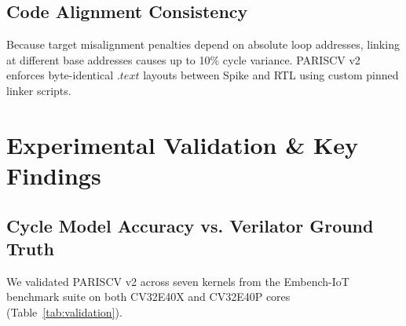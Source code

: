 \documentclass[conference]{IEEEtran}
\begin{document}
\subsection{Code Alignment Consistency}
Because target misalignment penalties depend on absolute loop addresses, linking at different base addresses causes up to 10\% cycle variance. PARISCV v2 enforces byte-identical $.text$ layouts between Spike and RTL using custom pinned linker scripts.

\section{Experimental Validation \& Key Findings}

\subsection{Cycle Model Accuracy vs. Verilator Ground Truth}
We validated PARISCV v2 across seven kernels from the Embench-IoT benchmark suite on both CV32E40X and CV32E40P cores (Table~\ref{tab:validation}).

\begin{table}[t]
\centering
\caption{PARISCV v2 Cycle Model Accuracy vs. Real Verilator RTL}
\label{tab:validation}
\vspace{-4pt}
\end{table}
\end{document}
